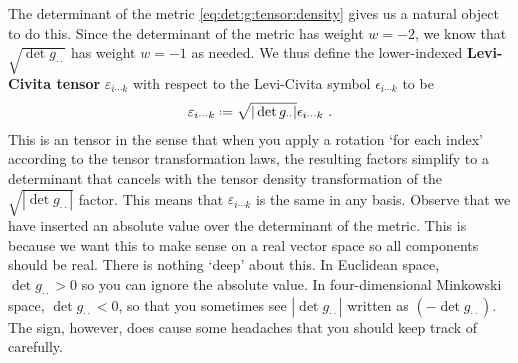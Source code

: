 \documentclass[12pt, oneside]{report}    %
\begin{document}
\begin{subappendices}
The determinant of the metric \eqref{eq:det:g:tensor:density} gives us a natural object to do this. Since the determinant of the metric has weight $w=-2$, we know that $\sqrt{\det g_{\cdot\cdot}}$ has weight $w=-1$ as needed. We thus define the lower-indexed \textbf{Levi-Civita tensor} $\varepsilon_{i\cdots k}$ with respect to the Levi-Civita symbol $\epsilon_{i\cdots k}$ to be
\begin{align}
    \varepsilon_{i\cdots k} \defeq \sqrt{|\det g_{\cdot\cdot}|} \epsilon_{i\cdots k} \ .
    \label{eq:Levi:Civita:tensor:definition}
\end{align}
This is an tensor in the sense that when you apply a rotation `for each index' according to the tensor transformation laws, the resulting factors simplify to a determinant that cancels with the tensor density transformation of the $\sqrt{|\det g_{\cdot\cdot}|} $ factor. This means that $\varepsilon_{i\cdots k}$ is the same in any basis.
Observe that we have inserted an absolute value over the determinant of the metric. This is because we want this to make sense on a real vector space so all components should be real. There is nothing `deep' about this. In Euclidean space, $\det g_{\cdot\cdot} > 0$ so you can ignore the absolute value. In four-dimensional Minkowski space, $\det g_{\cdot\cdot} < 0$, so that you sometimes see $|\det g_{\cdot\cdot}|$ written as $(-\det g_{\cdot\cdot})$. The sign, however, does cause some headaches that you should keep track of carefully.



\end{subappendices}
\end{document}
